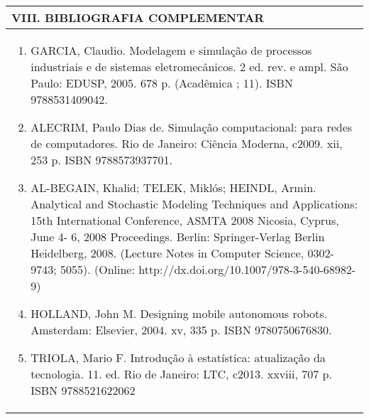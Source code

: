\documentclass[12pt]{article}
\begin{document}
\begin{longtable}{|L{1.025\textwidth}|} \hline
%
{\bf VIII. BIBLIOGRAFIA COMPLEMENTAR} \\ \hline
\begin{enumerate}

\item GARCIA, Claudio. Modelagem e simulação de processos industriais e de sistemas eletromecânicos. 2 ed. rev. e ampl. São Paulo: EDUSP, 2005. 678 p. (Acadêmica ; 11). ISBN 9788531409042.
\item ALECRIM, Paulo Dias de. Simulação computacional: para redes de computadores. Rio de Janeiro: Ciência Moderna, c2009. xii, 253 p. ISBN 9788573937701. 
\item AL-BEGAIN, Khalid; TELEK, Miklós; HEINDL, Armin. Analytical and Stochastic Modeling Techniques and Applications: 15th International Conference, ASMTA 2008 Nicosia, Cyprus, June 4- 6, 2008 Proceedings. Berlin: Springer-Verlag Berlin Heidelberg, 2008. (Lecture Notes in Computer Science, 0302-9743; 5055). (Online: http://dx.doi.org/10.1007/978-3-540-68982-9)

\item HOLLAND, John M. Designing mobile autonomous robots. Amsterdam: Elsevier, 2004. xv, 335 p. ISBN 9780750676830.
\item TRIOLA, Mario F. Introdução à estatística: atualização da tecnologia. 11. ed. Rio de
Janeiro: LTC, c2013. xxviii, 707 p. ISBN 9788521622062



\end{enumerate}
 \\ \hline
\end{longtable}



\end{document}
